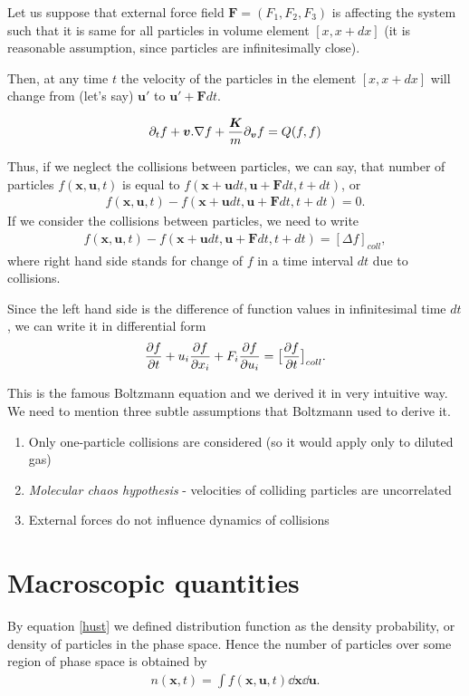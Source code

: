 Let us suppose that external force field $\bm{F} = (F_1, F_2, F_3)$ is affecting the system such that it is same for all particles in volume element $[x, x+ dx]$ (it is reasonable assumption, since particles are infinitesimally close).

Then, at any time $t$ the velocity of the particles in the element $[x, x + dx]$ will change from (let's say) $\bm{u'}$ to $\bm{u'} + \bm{F}dt$.

\begin{align} \label{boltzmanEq}
\partial_t f + \bm{v}.\nabla f + \frac{\bm{K}}{m}\partial_{\bm{v}} f = Q(f,f)
\end{align}

Thus, if we neglect the collisions between particles, we can say, that number of particles 
$f(\bm{x}, \bm{u}, t)$ is equal to $f(\bm{x + u}dt, \bm{u + F}dt, t + dt)$, or 
\begin{align}
f(\bm{x}, \bm{u}, t) - f(\bm{x + u}dt, \bm{u + F}dt, t + dt) = 0.
\end{align}
If we consider the collisions between particles, we need to write
\begin{align}
f(\bm{x}, \bm{u}, t) - f(\bm{x + u}dt, \bm{u + F}dt, t + dt) = [\Delta f]_{coll},
\end{align}
where right hand side stands for change of $f$ in a time interval $dt$ due to collisions.

Since the left hand side is the difference of function values in infinitesimal time $dt$,
we can write it in differential form
\begin{align} \label{BoltzmannE}
\frac{\partial f}{\partial t} + u_i \frac{\partial f}{\partial x_i} + F_i \frac{\partial f}{\partial u_i} = \big[\frac{\partial f}{\partial t} \big]_{coll}.
\end{align}

This is the famous Boltzmann equation and we derived it in very intuitive way. We need to mention three subtle assumptions that Boltzmann used to derive it.
\begin{enumerate}
\item Only one-particle collisions are considered (so it would apply only to diluted gas)
\item \textit{Molecular chaos hypothesis} - velocities of colliding particles are uncorrelated
\item External forces do not influence dynamics of collisions 
\end{enumerate}

\section{Macroscopic quantities}
By equation \ref{hust} we defined distribution function as the density probability, or density of particles in the phase space.
Hence the number of particles over some region of phase space is obtained by
\begin{align}
n(\bm{x},t) = \int f(\bm{x,u},t) \dd \bm{x} \dd \bm{u}.
\end{align}

